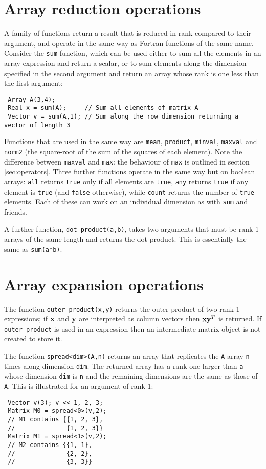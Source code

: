 \documentclass[a4,oneside]{book}
\def\codesize{\small}
\def\code#1{{\codesize\texttt{#1}}}
\begin{document}
\section{Array reduction operations}
\label{sec:reduce}
A family of functions return a result that is reduced in rank compared
to their argument, and operate in the same way as Fortran functions of
the same name.  Consider the \code{sum} function, which can be used
either to sum all the elements in an array expression and return a
scalar, or to sum elements along the dimension specified in the second
argument and return an array whose rank is one less than the first
argument:
\begin{lstlisting}
 Array A(3,4);
 Real x = sum(A);     // Sum all elements of matrix A
 Vector v = sum(A,1); // Sum along the row dimension returning a vector of length 3
\end{lstlisting}
Functions that are used in the same way are \code{mean},
\code{product}, \code{minval}, \code{maxval} and \code{norm2} (the
square-root of the sum of the squares of each element).  Note the
difference between \code{maxval} and \code{max}: the behaviour of
\code{max} is outlined in section \ref{sec:operators}. Three further
functions operate in the same way but on boolean arrays: \code{all}
returns \code{true} only if all elements are \code{true}, \code{any}
returns \code{true} if any element is \code{true} (and \code{false}
otherwise), while \code{count} returns the number of \code{true}
elements.  Each of these can work on an individual dimension as with
\code{sum} and friends.

A further function, \code{dot\_product(a,b)}, takes two arguments that
must be rank-1 arrays of the same length and returns the dot
product. This is essentially the same as \code{sum(a*b)}.

\section{Array expansion operations}
\label{sec:expand}
The function \code{outer\_product(x,y)} returns the outer product of
two rank-1 expressions; if ${\bf x}$ and ${\bf y}$ are interpreted as
column vectors then ${\bf xy}^T$ is returned. If \code{outer\_product}
is used in an expression then an intermediate matrix object is not
created to store it.

The function \code{spread<dim>(A,n)} returns an array that replicates
the \code{A} array \code{n} times along dimension \code{dim}. The
returned array has a rank one larger than \code{a} whose dimension
\code{dim} is \code{n} and the remaining dimensions are the same as
those of \code{A}. This is illustrated for an argument of rank 1:
\begin{lstlisting}
 Vector v(3); v << 1, 2, 3;
 Matrix M0 = spread<0>(v,2);
 // M1 contains {{1, 2, 3},
 //              {1, 2, 3}}
 Matrix M1 = spread<1>(v,2);
 // M2 contains {{1, 1},
 //              {2, 2},
 //              {3, 3}}
\end{lstlisting}
\end{document}
